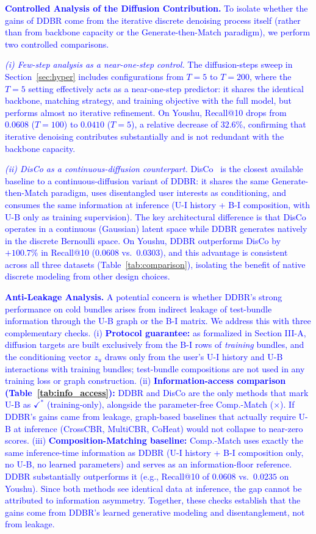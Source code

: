 \documentclass[lettersize,journal]{IEEEtran}
\newcommand{\revise}[1]{\textcolor{blue}{#1}}
\begin{document}
\revise{
\noindent\textbf{Controlled Analysis of the Diffusion Contribution.}
To isolate whether the gains of DDBR come from the iterative discrete denoising process itself (rather than from backbone capacity or the Generate-then-Match paradigm), we perform two controlled comparisons.

\textit{(i) Few-step analysis as a near-one-step control.} The diffusion-steps sweep in Section~\ref{sec:hyper} includes configurations from $T=5$ to $T=200$, where the $T=5$ setting effectively acts as a near-one-step predictor: it shares the identical backbone, matching strategy, and training objective with the full model, but performs almost no iterative refinement. On Youshu, Recall@10 drops from $0.0608$ ($T=100$) to $0.0410$ ($T=5$), a relative decrease of $32.6\%$, confirming that iterative denoising contributes substantially and is not redundant with the backbone capacity.

\textit{(ii) DisCo as a continuous-diffusion counterpart.} DisCo~\cite{bui2025personalized} is the closest available baseline to a continuous-diffusion variant of DDBR: it shares the same Generate-then-Match paradigm, uses disentangled user interests as conditioning, and consumes the same information at inference (U-I history + B-I composition, with U-B only as training supervision). The key architectural difference is that DisCo operates in a continuous (Gaussian) latent space while DDBR generates natively in the discrete Bernoulli space. On Youshu, DDBR outperforms DisCo by $+100.7\%$ in Recall@10 ($0.0608$ vs.\ $0.0303$), and this advantage is consistent across all three datasets (Table~\ref{tab:comparison}), isolating the benefit of native discrete modeling from other design choices.}

\revise{
\noindent\textbf{Anti-Leakage Analysis.}
A potential concern is whether DDBR's strong performance on cold bundles arises from indirect leakage of test-bundle information through the U-B graph or the B-I matrix. We address this with three complementary checks. (i) \textbf{Protocol guarantee:} as formalized in Section III-A, diffusion targets are built exclusively from the B-I rows of \emph{training} bundles, and the conditioning vector $z_u$ draws only from the user's U-I history and U-B interactions with training bundles; test-bundle compositions are not used in any training loss or graph construction. (ii) \textbf{Information-access comparison (Table~\ref{tab:info_access}):} DDBR and DisCo are the only methods that mark U-B as $\checkmark^*$ (training-only), alongside the parameter-free Comp.-Match ($\times$). If DDBR's gains came from leakage, graph-based baselines that actually require U-B at inference (CrossCBR, MultiCBR, CoHeat) would not collapse to near-zero scores. (iii) \textbf{Composition-Matching baseline:} Comp.-Match uses exactly the same inference-time information as DDBR (U-I history + B-I composition only, no U-B, no learned parameters) and serves as an information-floor reference. DDBR substantially outperforms it (e.g., Recall@10 of $0.0608$ vs.\ $0.0235$ on Youshu). Since both methods see identical data at inference, the gap cannot be attributed to information asymmetry. Together, these checks establish that the gains come from DDBR's learned generative modeling and disentanglement, not from leakage.
}
\end{document}
